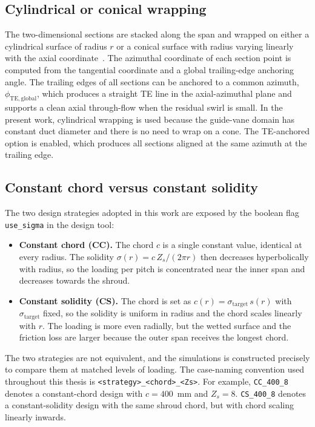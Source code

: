 \subsection{Cylindrical or conical wrapping}
\label{sec:theory_wrapping}
 
The two-dimensional sections are stacked along the span and wrapped on either a cylindrical surface of radius $r$ or a conical surface with radius varying linearly with the axial coordinate~\cite{Leonsen2025}. The azimuthal coordinate of each section point is computed from the tangential coordinate and a global trailing-edge anchoring angle. The trailing edges of all sections can be anchored to a common azimuth, $\phi_{\mathrm{TE,global}}$, which produces a straight TE line in the axial-azimuthal plane and supports a clean axial through-flow when the residual swirl is small. In the present work, cylindrical wrapping is used because the guide-vane domain has constant duct diameter and there is no need to wrap on a cone. The TE-anchored option is enabled, which produces all sections aligned at the same azimuth at the trailing edge.
 
\subsection{Constant chord versus constant solidity}
\label{sec:theory_const_chord_const_sol}
 
The two design strategies adopted in this work are exposed by the boolean flag \texttt{use\_sigma} in the design tool:
\begin{itemize}
  \item \textbf{Constant chord (CC).} The chord $c$ is a single constant value, identical at every radius. The solidity $\sigma(r) = c\,Z_s/(2\pi r)$ then decreases hyperbolically with radius, so the loading per pitch is concentrated near the inner span and decreases towards the shroud.
  \item \textbf{Constant solidity (CS).} The chord is set as $c(r) = \sigma_{\mathrm{target}}\,s(r)$ with $\sigma_{\mathrm{target}}$ fixed, so the solidity is uniform in radius and the chord scales linearly with $r$. The loading is more even radially, but the wetted surface and the friction loss are larger because the outer span receives the longest chord.
\end{itemize}
The two strategies are not equivalent, and the simulations is constructed precisely to compare them at matched levels of loading. The case-naming convention used throughout this thesis is \texttt{<strategy>\_<chord>\_<Zs>}. For example, \texttt{CC\_400\_8} denotes a constant-chord design with $c = 400$~mm and $Z_s = 8$. \texttt{CS\_400\_8} denotes a constant-solidity design with the same shroud chord, but with chord scaling linearly inwards.

